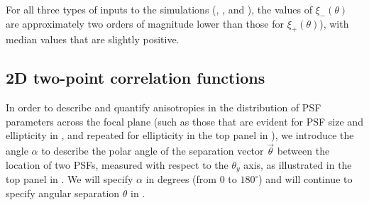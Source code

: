 \documentclass[twocolumn]{aastex631}
\begin{document}
For all three types of inputs to the simulations (\psfwssims, \bench, and \match), the values of $\xi_-(\theta)$ are approximately two orders of magnitude lower than those for $\xi_+(\theta)$), with median values that are slightly positive.

\subsection{2D two-point correlation functions}
\label{sec:anisocovar}
In order to describe and quantify anisotropies in the distribution of PSF parameters across the focal plane (such as those that are evident for PSF size and ellipticity in , and repeated for ellipticity in the top panel in ), we introduce the angle $\alpha$ to describe the polar angle of the separation vector $\vec\theta$ between the location of two PSFs, measured with respect to the $\theta_y$ axis, as illustrated in the top panel in .
We will specify $\alpha$ in degrees (from 0 to $180^\circ$) and  will continue to specify angular separation $\theta$ in \amin. 
\end{document}
